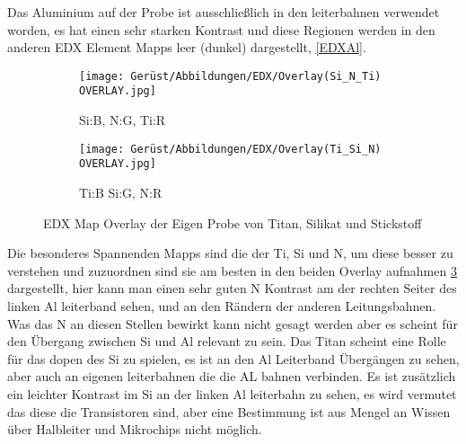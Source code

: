 Das Aluminium auf der Probe ist ausschließlich in den leiterbahnen verwendet worden, es hat einen sehr starken Kontrast und diese Regionen werden in den anderen EDX Element Mapps leer (dunkel) dargestellt, \cref{EDXAl}.


\begin{figure}[H]
     \centering
     \begin{subfigure}[b]{0.49\textwidth}
         \centering
         \texttt{[image: Gerüst/Abbildungen/EDX/Overlay(Si\_N\_Ti) OVERLAY.jpg]}
         \caption{Si:B, N:G, Ti:R}
         \label{Overlay}
     \end{subfigure}
     \hfill
     \begin{subfigure}[b]{0.49\textwidth}
         \centering
         \texttt{[image: Gerüst/Abbildungen/EDX/Overlay(Ti\_Si\_N) OVERLAY.jpg]}
         \caption{Ti:B Si:G, N:R}
         \label{Overlay2}
     \end{subfigure}
        \caption{EDX Map Overlay der Eigen Probe von Titan, Silikat und Stickstoff}
        \label{EDXOverlay}
\end{figure}

Die besonderes Spannenden Mapps sind die der Ti, Si und N, um diese besser zu verstehen und zuzuordnen sind sie am besten in den beiden Overlay aufnahmen \cref{EDXOverlay} dargestellt, hier kann man einen sehr guten N Kontrast am der rechten Seiter des linken Al leiterband sehen, und an den Rändern der anderen Leitungsbahnen. Was das N an diesen Stellen bewirkt kann nicht gesagt werden aber es scheint für den Übergang zwischen Si und Al relevant zu sein. Das Titan scheint eine Rolle für das dopen des Si zu spielen, es ist an den Al Leiterband Übergängen zu sehen, aber auch an eigenen leiterbahnen die die AL bahnen verbinden. Es ist zusätzlich ein leichter Kontrast im Si an der linken Al leiterbahn zu sehen, es wird vermutet das diese die Transistoren sind, aber eine Bestimmung ist aus Mengel an Wissen über Halbleiter und Mikrochips nicht möglich.

